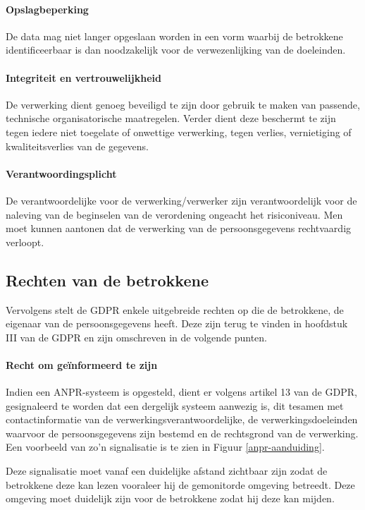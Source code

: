 \paragraph{Opslagbeperking}
De data mag niet langer opgeslaan worden in een vorm waarbij de betrokkene identificeerbaar is dan noodzakelijk voor de verwezenlijking van de doeleinden.

\paragraph{Integriteit en vertrouwelijkheid}
De verwerking dient genoeg beveiligd te zijn door gebruik te maken van passende, technische organisatorische maatregelen. Verder dient deze beschermt te zijn tegen iedere niet toegelate of onwettige verwerking, tegen verlies, vernietiging of kwaliteitsverlies van de gegevens.

\paragraph{Verantwoordingsplicht}
De verantwoordelijke voor de verwerking/verwerker zijn verantwoordelijk voor de naleving van de beginselen van de verordening ongeacht het risiconiveau. Men moet kunnen aantonen dat de verwerking van de persoonsgegevens rechtvaardig verloopt.

\subsection{Rechten van de betrokkene}
\label{rechten-betrokkene}
Vervolgens stelt de GDPR enkele uitgebreide rechten op die de betrokkene, de eigenaar van de persoonsgegevens heeft. Deze zijn terug te vinden in hoofdstuk III van de GDPR en zijn omschreven in de volgende punten.

\paragraph{Recht om geïnformeerd te zijn}
Indien een ANPR-systeem is opgesteld, dient er volgens artikel 13 van de GDPR, gesignaleerd te worden dat een dergelijk systeem aanwezig is, dit tesamen met contactinformatie van de verwerkingsverantwoordelijke, de verwerkingsdoeleinden waarvoor de persoonsgegevens zijn bestemd en de rechtsgrond van de verwerking. Een voorbeeld van zo'n signalisatie is te zien in Figuur \ref{anpr-aanduiding}.

Deze signalisatie moet vanaf een duidelijke afstand zichtbaar zijn zodat de betrokkene deze kan lezen vooraleer hij de gemonitorde omgeving betreedt. Deze omgeving moet duidelijk zijn voor de betrokkene zodat hij deze kan mijden.

